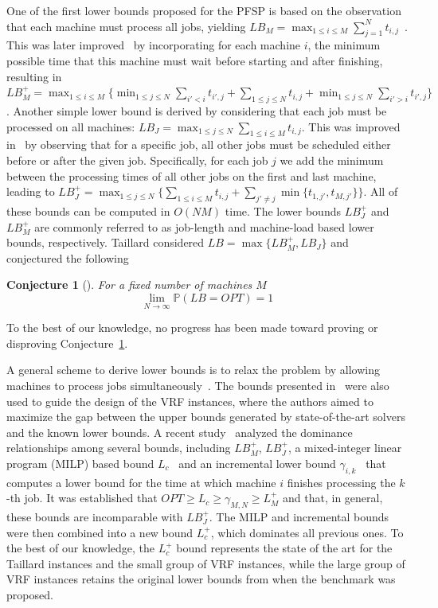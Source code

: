 \documentclass{article}
\theoremstyle{thmstyleone}%
\newtheorem{conjecture}[theorem]{Conjecture}%
\theoremstyle{thmstyletwo}%
\theoremstyle{thmstylethree}%
\begin{document}
One of the first lower bounds proposed for the PFSP is 
based on the observation that each machine must process all jobs, yielding $LB_M = \max_{1 \leq i \leq M} \sum_{j=1}^N t_{i,j}$~\cite{Heller}. 
This was later improved~\cite{MachineLBImproved, TaillardConjecture} by incorporating for each machine $i$, the minimum possible time that this machine must wait before starting and after finishing, resulting in $LB_M^+ = \max_{1 \leq i \leq M} \{ \min_{1 \leq j \leq N} \sum_{i' < i} t_{i', j} + \sum_{1 \leq j \leq N} t_{i,j} + \min_{1 \leq j \leq N} \sum_{i' > i} t_{i', j} \}$. 
Another simple lower bound is derived by considering that each job must be processed on all machines: $LB_J = \max_{1 \leq j \leq N} \sum_{1 \leq i \leq M} t_{i,j}$. 
This was improved in~\cite{JobBaseLB_Improved} by observing that for a specific job, all other jobs must be scheduled either before or after the given job. 
Specifically, for each job $j$ we add the minimum between the processing times of all other jobs on the first and last machine, leading to $LB_J^+ = \max_{1 \leq j \leq N} \{ \sum_{1 \leq i \leq M} t_{i,j} + \sum_{j' \neq j} \min \{t_{1,j'}, t_{M, j'}\}\}$. 
All of these bounds can be computed in $O(NM)$ time. 
The lower bounds $LB_J^+$ and $LB_M^+$ are commonly referred to as job-length and machine-load based lower bounds, respectively.  
Taillard considered $LB = \max \{LB_M^+, LB_J\}$ and conjectured the following

\begin{conjecture}[\cite{TaillardConjecture}]
\label{Conj:Taillard}
For a fixed number of machines $M$ 
$$
\lim_{N \to \infty} \mathbb{P}(LB = OPT) = 1
$$
\end{conjecture}

To the best of our knowledge, no progress has been made toward proving or disproving Conjecture~\ref{Conj:Taillard}. 

A general scheme to derive lower bounds is to relax the problem by allowing machines to process jobs simultaneously~\cite{LowerBoundLADHARI}. The bounds presented in~\cite{LowerBoundLADHARI} were also used to guide the design of the VRF instances, where the authors aimed to maximize the gap between the upper bounds generated by state-of-the-art solvers and the known lower bounds.
A recent study~\cite{LowerBoundsNew} analyzed the dominance relationships among several bounds, including  $LB_M^+$, $LB_J^+$, a mixed-integer linear program (MILP) based bound $L_c$~\cite{MILPBound} and an incremental lower bound $\gamma_{i,k}$~\cite{kumarBound} that computes a lower bound for the time at which machine $i$ finishes processing the $k$-th job.  
It was established that $OPT \ge L_c \geq \gamma_{M,N} \geq L_M^+$ and that, in general, these bounds are incomparable with $LB_J^+$. 
The MILP and incremental bounds were then combined into a new bound $L_c^+$, which dominates all previous ones.  
To the best of our knowledge, the $L_c^+$ bound represents the state of the art for the Taillard instances and the small group of VRF instances, while the large group of VRF instances retains the original lower bounds from when the benchmark was proposed. 
\end{document}
